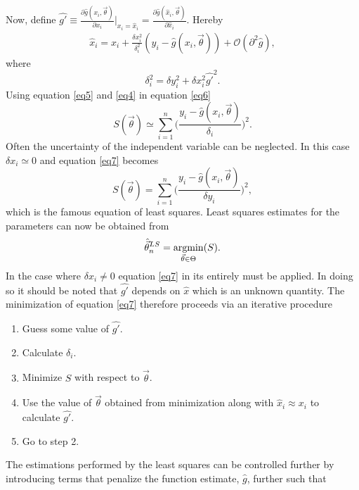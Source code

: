 Now, define $\hat{g'}\equiv \frac{\partial \hat{g}(x_i,\vec{\theta})}{\partial x_i}\bigg|_{x_i=\hat{x}_i}=\frac{\partial \hat{g}(\hat{x}_i,\vec{\theta})}{\partial \hat{x}_i}$. Hereby
\begin{equation}
	\begin{split}
		\hat{x}_i=x_i+\frac{\delta x_i^2}{\delta_i^2}(y_i-\hat{g}(x_i,\vec{\theta}))+\mathcal{O}(\partial^2\hat{g}),
	\end{split}
	\label{eq5}
\end{equation}
where
\begin{equation}
	\delta_i^2=\delta y_i^2+\delta x_i^2\hat{g'}^2.
\end{equation}
Using equation \eqref{eq5} and \eqref{eq4} in equation \eqref{eq6}
\begin{equation}
	S(\vec{\theta})\simeq\sum_{i=1}^n\bigg(\frac{y_i-\hat{g}(x_i,\vec{\theta})}{\delta_i}\bigg)^2.
	\label{eq7}
\end{equation}
Often the uncertainty of the independent variable can be neglected. In this case $\delta x_i\simeq 0$ and equation \eqref{eq7} becomes
\begin{equation}
	S(\vec{\theta})=\sum_{i=1}^n\bigg(\frac{y_i-\hat{g}(x_i,\vec{\theta})}{\delta y_i}\bigg)^2,
	\label{eq8}
\end{equation}
which is the famous equation of least squares. Least squares estimates for the parameters can now be obtained from
\begin{equation}
	\hat{\vec{ \theta}}_n^{LS}=\operatorname*{argmin}_{\vec{\theta}\in \Theta}(S).
\end{equation}
In the case where $\delta x_i\neq 0$ equation \eqref{eq7} in its entirely must be applied. In doing so it should be noted that $\hat{g'}$ depends on $\hat{x}$ which is an unknown quantity. The minimization of equation \eqref{eq7} therefore proceeds via an iterative procedure
\begin{enumerate}
	\item Guess some value of $\hat{g'}$.
	\item Calculate $\delta_i$.
	\item Minimize $S$ with respect to $\vec{\theta}$.
	\item Use the value of $\vec{\theta}$ obtained from minimization along with $\hat{x}_i\approx x_i$ to calculate $\hat{g'}$.
	\item Go to step 2.\newline
\end{enumerate}
The estimations performed by the least squares can be controlled further by introducing terms that penalize the function estimate, $\hat{g}$, further such that
